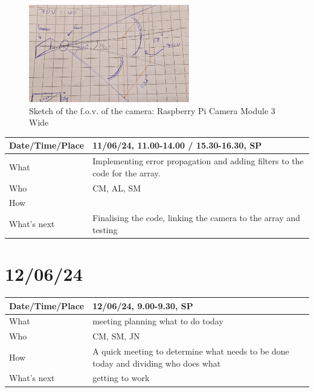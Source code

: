 \documentclass{article}
\begin{document}
\begin{figure}[H]
    \centering
    \includegraphics[width=7cm]{Foto tekening sensor en F.O.V..jpg}
    \caption{Sketch of the f.o.v. of the camera: Raspberry Pi Camera Module 3 Wide}   
\end{figure}


\begin{table}[H]
\begin{tabular}{|p{1.5in}|p{4in}|}
\hline
Date/Time/Place & 11/06/24, 11.00-14.00 / 15.30-16.30, SP \\ \hline
What            & Implementing error propagation and adding filters to the code for the array. \\ \hline
Who             & CM, AL, SM \\ \hline
How             &  \\ \hline
What's next     & Finalising the code, linking the camera to the array and testing \\ \hline
\end{tabular}
\end{table}

\section{12/06/24}

\begin{table}[H]
\begin{tabular}{|p{1.5in}|p{4in}|}
\hline
Date/Time/Place & 12/06/24, 9.00-9.30, SP \\ \hline
What            & meeting planning what to do today \\ \hline
Who             & CM, SM, JN \\ \hline
How             & A quick meeting to determine what needs to be done today and dividing who does what \\ \hline
What's next     &  getting to work\\ \hline
\end{tabular}
\end{table}
\end{document}
